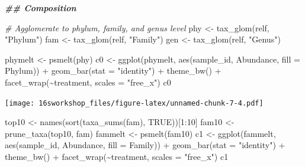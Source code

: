 \documentclass[
]{book}
\newenvironment{Shaded}{\begin{snugshade}}{\end{snugshade}}
\newcommand{\AttributeTok}[1]{\textcolor[rgb]{0.77,0.63,0.00}{#1}}
\newcommand{\CommentTok}[1]{\textcolor[rgb]{0.56,0.35,0.01}{\textit{#1}}}
\newcommand{\ConstantTok}[1]{\textcolor[rgb]{0.00,0.00,0.00}{#1}}
\newcommand{\DecValTok}[1]{\textcolor[rgb]{0.00,0.00,0.81}{#1}}
\newcommand{\DocumentationTok}[1]{\textcolor[rgb]{0.56,0.35,0.01}{\textbf{\textit{#1}}}}
\newcommand{\FunctionTok}[1]{\textcolor[rgb]{0.00,0.00,0.00}{#1}}
\newcommand{\NormalTok}[1]{#1}
\newcommand{\OtherTok}[1]{\textcolor[rgb]{0.56,0.35,0.01}{#1}}
\newcommand{\SpecialCharTok}[1]{\textcolor[rgb]{0.00,0.00,0.00}{#1}}
\newcommand{\StringTok}[1]{\textcolor[rgb]{0.31,0.60,0.02}{#1}}
\begin{document}
\begin{Shaded}
\begin{Highlighting}[]
\DocumentationTok{\#\# Composition}

\CommentTok{\# Agglomerate to phylum, family, and genus level}
\NormalTok{phy }\OtherTok{\textless{}{-}} \FunctionTok{tax\_glom}\NormalTok{(relf, }\StringTok{"Phylum"}\NormalTok{)}
\NormalTok{fam }\OtherTok{\textless{}{-}} \FunctionTok{tax\_glom}\NormalTok{(relf, }\StringTok{"Family"}\NormalTok{)}
\NormalTok{gen }\OtherTok{\textless{}{-}} \FunctionTok{tax\_glom}\NormalTok{(relf, }\StringTok{"Genus"}\NormalTok{)}

\NormalTok{phymelt }\OtherTok{\textless{}{-}} \FunctionTok{psmelt}\NormalTok{(phy)}
\NormalTok{c0 }\OtherTok{\textless{}{-}} \FunctionTok{ggplot}\NormalTok{(phymelt, }\FunctionTok{aes}\NormalTok{(sample\_id, Abundance, }\AttributeTok{fill =}\NormalTok{ Phylum)) }\SpecialCharTok{+}
  \FunctionTok{geom\_bar}\NormalTok{(}\AttributeTok{stat =} \StringTok{"identity"}\NormalTok{) }\SpecialCharTok{+}
  \FunctionTok{theme\_bw}\NormalTok{() }\SpecialCharTok{+}
  \FunctionTok{facet\_wrap}\NormalTok{(}\SpecialCharTok{\textasciitilde{}}\NormalTok{treatment, }\AttributeTok{scales =} \StringTok{"free\_x"}\NormalTok{)}
\NormalTok{c0}
\end{Highlighting}
\end{Shaded}

\texttt{[image: 16sworkshop\_files/figure-latex/unnamed-chunk-7-4.pdf]}

\begin{Shaded}
\begin{Highlighting}[]
\NormalTok{top10 }\OtherTok{\textless{}{-}} \FunctionTok{names}\NormalTok{(}\FunctionTok{sort}\NormalTok{(}\FunctionTok{taxa\_sums}\NormalTok{(fam), }\ConstantTok{TRUE}\NormalTok{))[}\DecValTok{1}\SpecialCharTok{:}\DecValTok{10}\NormalTok{]}
\NormalTok{fam10 }\OtherTok{\textless{}{-}} \FunctionTok{prune\_taxa}\NormalTok{(top10, fam)}
\NormalTok{fammelt }\OtherTok{\textless{}{-}} \FunctionTok{psmelt}\NormalTok{(fam10)}
\NormalTok{c1 }\OtherTok{\textless{}{-}} \FunctionTok{ggplot}\NormalTok{(fammelt, }\FunctionTok{aes}\NormalTok{(sample\_id, Abundance, }\AttributeTok{fill =}\NormalTok{ Family)) }\SpecialCharTok{+}
  \FunctionTok{geom\_bar}\NormalTok{(}\AttributeTok{stat =} \StringTok{"identity"}\NormalTok{) }\SpecialCharTok{+}
  \FunctionTok{theme\_bw}\NormalTok{() }\SpecialCharTok{+}
  \FunctionTok{facet\_wrap}\NormalTok{(}\SpecialCharTok{\textasciitilde{}}\NormalTok{treatment, }\AttributeTok{scales =} \StringTok{"free\_x"}\NormalTok{)}
\NormalTok{c1}
\end{Highlighting}
\end{Shaded}
\end{document}
